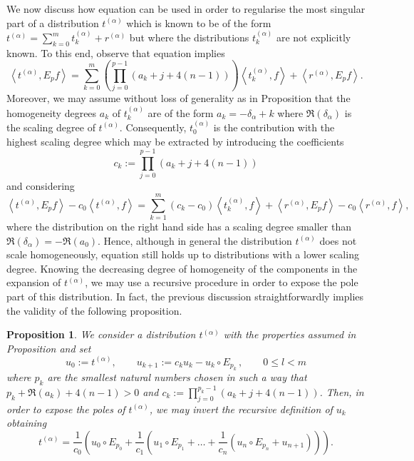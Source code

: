 \documentclass[10pt]{book}
\theoremstyle{break}
\newtheorem{proposition}{Proposition}
\begin{document}
We now discuss how equation %
can be used in order to regularise the most singular part of a distribution 
$t^{(\alpha)}$ which is known to be of the form $t^{(\alpha)} = \sum_{k=0}^m t^{(\alpha)}_k + r^{(\alpha)}$ but where the distributions $ t^{(\alpha)}_k$ are not explicitly known. To this end, observe that equation %
implies
\[
\left\langle t^{(\alpha)}, E_p f \right\rangle = 
\sum_{k=0}^m \left(\prod_{j=0}^{p-1} (a_k+j+4(n-1)) \right)  \left\langle t^{(\alpha)}_k, f \right\rangle + \left\langle r^{(\alpha)},E_p f\right\rangle.
\]
Moreover, we may assume without loss of generality as in Proposition %
that the homogeneity degrees $a_k$ of $t^{(\alpha)}_k$ are of the form $a_k=-\delta_\alpha + k$ where $\Re(\delta_\alpha)$ is the scaling degree of $t^{(\alpha)}$. Consequently, $t^{(\alpha)}_0$ is the contribution with the highest scaling degree which may be extracted by introducing the coefficients
\[
c_k:=\prod_{j=0}^{p-1} \left(a_k+j+4(n-1)\right)
\]
and considering 
%
\begin{equation*}
\left\langle t^{(\alpha)}, E_p f \right\rangle - c_0   \left\langle t^{(\alpha)}, f \right\rangle   =
\sum_{k=1}^m (c_k-c_0)   \left\langle t^{(\alpha)}_k, f \right\rangle +  \left\langle r^{(\alpha)}, E_p f \right\rangle - c_0 \left\langle r^{(\alpha)}, f \right\rangle,
\end{equation*}
%
where the distribution on the right hand side has a scaling degree smaller than $\Re(\delta_\alpha) = - \Re (a_0)$. Hence, although in general the distribution $t^{(\alpha)}$ does not scale homogeneously, equation %
still holds up to distributions with a lower scaling degree. Knowing the decreasing degree of homogeneity of the components in the expansion of $t^{(\alpha)}$, we may use a recursive procedure in order to expose the pole part of this distribution. In fact, the previous discussion straightforwardly implies the validity of the following proposition.


\begin{proposition}
We consider a distribution $t^{(\alpha)}$ with the properties assumed in Proposition %
and set
\[
u_0 := t^{(\alpha)},\qquad    u_{k+1} :=  c_k u_k -  u_k \circ E_{p_k}\,  , \qquad 0\le l< m
\]
where $p_k$ are the smallest natural numbers chosen in such a way that $p_k+\Re (a_k)+4(n-1)>0$ and $c_k :=\prod_{j=0}^{p_k-1} \left(a_k+j+4(n-1)\right)$.
Then, in order to expose the poles of $t^{(\alpha)}$, we may invert the recursive definition of $u_k$ obtaining
\begin{equation*}
t^{(\alpha)} = \frac{1}{c_0} \left( u_0\circ E_{p_0} +  \frac{1}{c_1} \left( u_1 \circ E_{p_1} +\dots +\frac{1}{c_n}\left(  u_n \circ E_{p_n}+ u_{n+1}   \right)   \right)\right).
\end{equation*}
\end{proposition}
\end{document}
